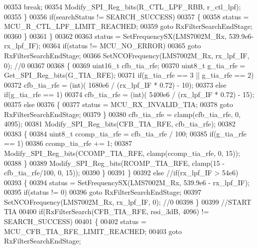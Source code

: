 \begin{DoxyCode}
00353                 \textcolor{keywordflow}{break};
00354             Modify_SPI_Reg_bits(R_CTL_LPF_RBB, r\_ctl\_lpf);
00355         \}
00356         \textcolor{keywordflow}{if}(searchStatus != SEARCH_SUCCESS)
00357         \{
00358             status = MCU_R_CTL_LPF_LIMIT_REACHED;
00359             \textcolor{keywordflow}{goto} RxFilterSearchEndStage;
00360         \}
00361         \}
00362 
00363         status = SetFrequencySX(LMS7002M_Rx, 539.9e6-rx\_lpf\_IF);
00364         \textcolor{keywordflow}{if}(status != MCU_NO_ERROR)
00365             \textcolor{keywordflow}{goto} RxFilterSearchEndStage;
00366         SetNCOFrequency(LMS7002M_Rx, rx\_lpf\_IF, 0); \textcolor{comment}{//0}
00367 
00368         \{
00369             uint16\_t cfb\_tia\_rfe;
00370             uint8\_t g\_tia\_rfe = Get_SPI_Reg_bits(G_TIA_RFE);
00371             \textcolor{keywordflow}{if}(g\_tia\_rfe == 3 || g\_tia\_rfe == 2)
00372                 cfb\_tia\_rfe = (int)( 1680e6 / (rx\_lpf\_IF * 0.72) - 10);
00373             \textcolor{keywordflow}{else} \textcolor{keywordflow}{if}(g\_tia\_rfe == 1)
00374                 cfb\_tia\_rfe = (int)( 5400e6 / (rx\_lpf\_IF * 0.72) - 15);
00375             \textcolor{keywordflow}{else}
00376             \{
00377                 status = MCU_RX_INVALID_TIA;
00378                 \textcolor{keywordflow}{goto} RxFilterSearchEndStage;
00379             \}
00380             cfb\_tia\_rfe = clamp(cfb\_tia\_rfe, 0, 4095);
00381             Modify_SPI_Reg_bits(CFB_TIA_RFE, cfb\_tia\_rfe);
00382 
00383             \{
00384                 uint8\_t ccomp\_tia\_rfe = cfb\_tia\_rfe / 100;
00385                 \textcolor{keywordflow}{if}(g\_tia\_rfe == 1)
00386                     ccomp\_tia\_rfe += 1;
00387                 Modify_SPI_Reg_bits(CCOMP_TIA_RFE, clamp(ccomp\_tia\_rfe, 0, 15));
00388             \}
00389             Modify_SPI_Reg_bits(RCOMP_TIA_RFE, clamp(15 - cfb\_tia\_rfe/100, 0, 15));
00390         \}
00391     \}
00392     \textcolor{keywordflow}{else} \textcolor{comment}{//if(rx\_lpf\_IF > 54e6)}
00393     \{
00394         status = SetFrequencySX(LMS7002M_Rx, 539.9e6 - rx\_lpf\_IF);
00395         \textcolor{keywordflow}{if}(status != 0)
00396             \textcolor{keywordflow}{goto} RxFilterSearchEndStage;
00397         SetNCOFrequency(LMS7002M_Rx, rx\_lpf\_IF, 0); \textcolor{comment}{//0}
00398     \}
00399     \textcolor{comment}{//START TIA}
00400     \textcolor{keywordflow}{if}(RxFilterSearch(CFB_TIA_RFE, rssi\_3dB, 4096) != SEARCH_SUCCESS)
00401     \{
00402         status = MCU_CFB_TIA_RFE_LIMIT_REACHED;
00403         \textcolor{keywordflow}{goto} RxFilterSearchEndStage;

\end{DoxyCode}

